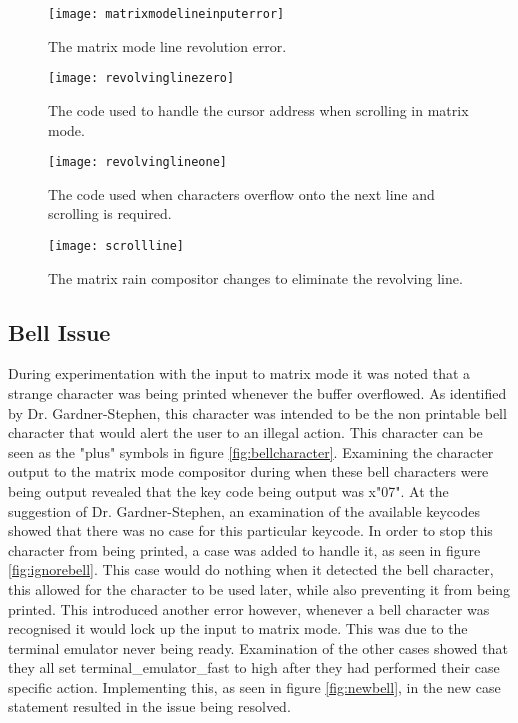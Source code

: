 \begin{figure}
  \centering
  \texttt{[image: matrixmodelineinputerror]}
  \caption{The matrix mode line revolution error.}
  \label{fig:matrixmodelineinputerror}
\end{figure}

\begin{figure}
  \centering
  \texttt{[image: revolvinglinezero]}
  \caption{The code used to handle the cursor address when scrolling in matrix mode.}
  \label{fig:revolvinglinezero}
\end{figure}

\begin{figure}
  \centering
  \texttt{[image: revolvinglineone]}
  \caption{The code used when characters overflow onto the next line and scrolling is required.}
  \label{fig:revolvinglineone}
\end{figure}

\begin{figure}
  \centering
  \texttt{[image: scrollline]}
  \caption{The matrix rain compositor changes to eliminate the revolving line.}
  \label{fig:scrollline}
\end{figure}


\subsection{Bell Issue}

\label{Ch5 Sec3 Sub2}

During experimentation with the input to matrix mode it was noted that a strange character was being printed whenever the buffer overflowed. As identified by Dr. Gardner-Stephen, this character was intended to be the non printable bell character that would alert the user to an illegal action. This character can be seen as the "plus" symbols in figure \ref{fig:bellcharacter}. Examining the character output to the matrix mode compositor during when these bell characters were being output revealed that the key code being output was x"07". At the suggestion of Dr. Gardner-Stephen, an examination of the available keycodes showed that there was no case for this particular keycode. In order to stop this character from being printed, a case was added to handle it, as seen in figure \ref{fig:ignorebell}. This case would do nothing when it detected the bell character, this allowed for the character to be used later, while also preventing it from being printed. This introduced another error however, whenever a bell character was recognised it would lock up the input to matrix mode. This was due to the terminal emulator never being ready. Examination of the other cases showed that they all set terminal\_emulator\_fast to high after they had performed their case specific action. Implementing this, as seen in figure \ref{fig:newbell}, in the new case statement resulted in the issue being resolved.

